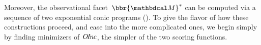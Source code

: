 \documentclass[twoside]{article}
\newcommand\obslimit{observational facet} %
\begin{document}
Moreover,
the \obslimit\
$\bbr{\dg M}^*$ can be computed via a sequence of two exponential conic programs ().
To give the flavor of how these constructions proceed, and ease into the more complicated ones, we begin simply by finding minimizers of $\mathit{O\mskip-2.5muI\mskip-3.5mun\mskip-1.7muc}$, the simpler of the two scoring functions.

%

\end{document}
